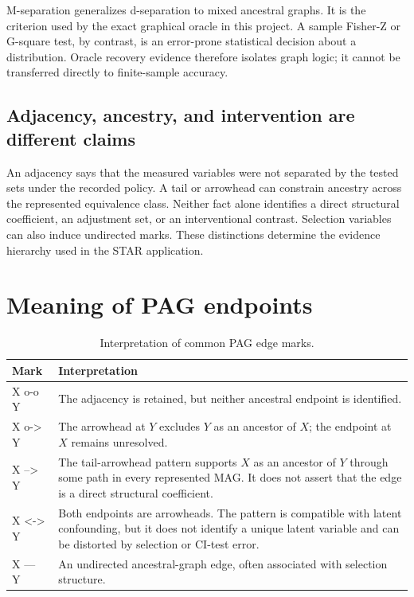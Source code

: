 \documentclass[11pt,a4paper,oneside]{report}
\begin{document}
M-separation generalizes d-separation to mixed ancestral graphs.  It is the
criterion used by the exact graphical oracle in this project.  A sample
Fisher-Z or G-square test, by contrast, is an error-prone statistical decision
about a distribution.  Oracle recovery evidence therefore isolates graph
logic; it cannot be transferred directly to finite-sample accuracy.

\subsection{Adjacency, ancestry, and intervention are different claims}

An adjacency says that the measured variables were not separated by the
tested sets under the recorded policy.  A tail or arrowhead can constrain
ancestry across the represented equivalence class.  Neither fact alone
identifies a direct structural coefficient, an adjustment set, or an
interventional contrast.  Selection variables can also induce undirected
marks.  These distinctions determine the evidence hierarchy used in the STAR
application.

\section{Meaning of PAG endpoints}

\begin{table}[H]
\centering
\caption{Interpretation of common PAG edge marks.}
\label{tab:pag-marks}
\begin{tabularx}{\textwidth}{>{\ttfamily}p{}Y}
\toprule
Mark & Interpretation \\
\midrule
X o-o Y & The adjacency is retained, but neither ancestral endpoint is
identified. \\
X o-> Y & The arrowhead at \(Y\) excludes \(Y\) as an ancestor of \(X\);
the endpoint at \(X\) remains unresolved. \\
X --> Y & The tail-arrowhead pattern supports \(X\) as an ancestor of \(Y\)
through some path in every represented MAG. It does not assert that the edge
is a direct structural coefficient. \\
X <-> Y & Both endpoints are arrowheads. The pattern is compatible with latent
confounding, but it does not identify a unique latent variable and can be
distorted by selection or CI-test error. \\
X --- Y & An undirected ancestral-graph edge, often associated with selection
structure. \\
\bottomrule
\end{tabularx}
\end{table}
\end{document}
